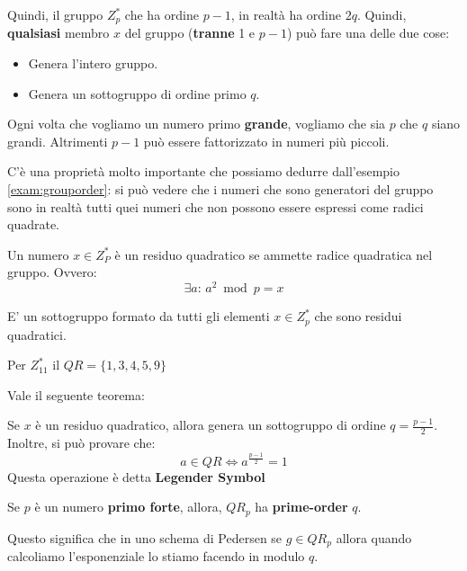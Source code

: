 Quindi, il gruppo $Z_p^*$ che ha ordine $p-1$, in realtà ha ordine $2q$. Quindi, \textbf{qualsiasi} membro $x$ del gruppo (\textbf{tranne} 1 e $p-1$) può fare una delle due cose:
\begin{itemize}
    \item Genera l'intero gruppo.
    \item Genera un sottogruppo di ordine primo $q$.
\end{itemize}
\begin{remark}
Ogni volta che vogliamo un numero primo \textbf{grande}, vogliamo che sia $p$ che $q$ siano grandi. Altrimenti $p-1$ può essere fattorizzato in numeri più piccoli. 
\end{remark}
\begin{remark}
C'è una proprietà molto importante che possiamo dedurre dall'esempio \ref{exam:grouporder}: si può vedere che i numeri che sono generatori del gruppo sono in realtà tutti quei numeri che non possono essere espressi come radici quadrate.
\end{remark}
\begin{definition}\label{def:quadres}
Un numero $x\in Z_P^*$ è un residuo quadratico se ammette radice quadratica nel gruppo. Ovvero:\[\exists a:\,a^2\bmod{p}=x\]
\end{definition}
\begin{definition}\label{def:qr}
E' un sottogruppo formato da tutti gli elementi $x\in Z_p^*$ che sono residui quadratici.
\end{definition}
\begin{example}
Per $Z_{11}^*$ il $QR=\{1,3,4,5,9\}$
\end{example}
Vale il seguente teorema:
\begin{theorem}
Se $x$ è un residuo quadratico, allora genera un sottogruppo di ordine $q=\frac{p-1}{2}$.\\
Inoltre, si può provare che:
\[a\in{QR}\Longleftrightarrow a^{\frac{p-1}{2}}=1\]
Questa operazione è detta \textbf{Legender Symbol}
\end{theorem}
\begin{corollary}
Se $p$ è un numero \textbf{primo forte}, allora, $QR_p$ ha \textbf{prime-order} $q$.
\end{corollary}
\begin{remark}
Questo significa che in uno schema di Pedersen se $g\in {QR_p}$ allora quando calcoliamo l'esponenziale lo stiamo facendo in modulo $q$.
\end{remark}

